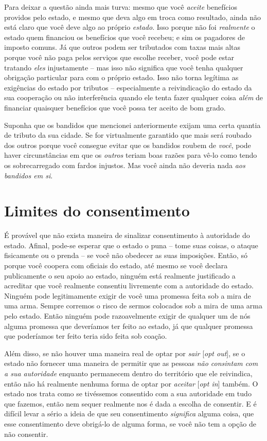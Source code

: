 Para deixar a questão ainda mais turva: mesmo que você \emph{aceite} benefícios providos pelo estado, e mesmo que deva algo em troca como resultado, ainda não está claro que você deve algo ao próprio \emph{estado}. Isso porque não foi \emph{realmente} o estado quem financiou os benefícios que você recebeu; e sim os pagadores de imposto comuns. Já que outros podem ser tributados com taxas mais altas porque você não paga pelos serviços que escolhe receber, você pode estar tratando \emph{eles} injustamente -- mas isso não significa que você tenha qualquer obrigação particular para com o próprio estado. Isso não torna legítima as exigências do estado por tributos -- especialmente a reivindicação do estado da sua cooperação ou não interferência quando ele tenta fazer qualquer coisa \emph{além} de financiar quaisquer benefícios que você possa ter aceito de bom grado.

Suponha que os bandidos que mencionei anteriormente exijam uma certa quantia de tributo da sua cidade. Se for virtualmente garantido que mais será roubado dos outros porque você consegue evitar que os bandidos roubem de \emph{você}, pode haver circunstâncias em que os \emph{outros} teriam boas razões para vê-lo como tendo os sobrecarregado com fardos injustos. Mas você ainda não deveria nada \emph{aos bandidos em si}.

\section{Limites do consentimento}

É provável que não exista maneira de sinalizar consentimento à autoridade do estado. Afinal, pode-se esperar que o estado o puna -- tome suas coisas, o ataque fisicamente ou o prenda -- se você não obedecer as suas imposições. Então, só porque você coopera com oficiais do estado, até mesmo se você declara publicamente o seu apoio ao estado, ninguém está realmente justificado a acreditar que você realmente consentiu livremente com a autoridade do estado. Ninguém pode legitimamente exigir de você uma promessa feita sob a mira de uma arma. Sempre corremos o risco de sermos colocados sob a mira de uma arma pelo estado. Então ninguém pode razoavelmente exigir de qualquer um de nós alguma promessa que deveríamos ter feito ao estado, já que qualquer promessa que poderíamos ter feito teria sido feita sob coação.

Além disso, se não houver uma maneira real de optar por \emph{sair} [\emph{opt out}], se o estado não fornecer uma maneira de permitir que as pessoas \emph{não consintam com a sua autoridade} enquanto permanecem dentro do território que ele reivindica, então não há realmente nenhuma forma de optar por \emph{aceitar} [\emph{opt in}] também. O estado nos trata como se tivéssemos consentido com a sua autoridade em tudo que fazemos, então nem sequer realmente nos é dada a escolha de consentir. E é difícil levar a sério a ideia de que seu consentimento \emph{significa} alguma coisa, que esse consentimento deve obrigá-lo de alguma forma, se você não tem a opção de não consentir.

